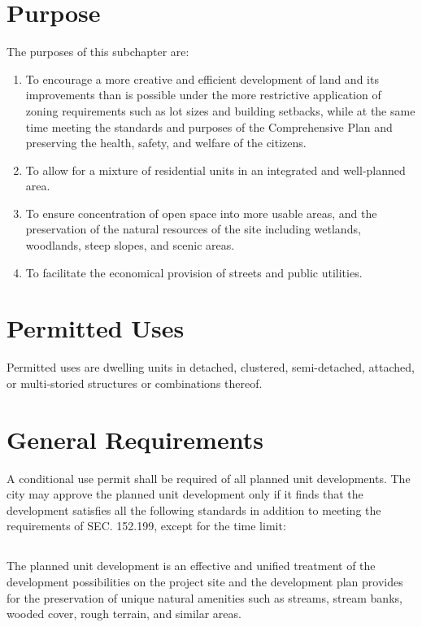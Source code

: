 \section{Purpose}
The purposes of this subchapter are:
\begin{enumerate}[{\indent}A)]
    \item To encourage a more creative and efficient development of land and its improvements than is possible under the more restrictive application of zoning requirements such as lot sizes and building setbacks, while at the same time meeting the standards and purposes of the Comprehensive Plan and preserving the health, safety, and welfare of the citizens.
    \item To allow for a mixture of residential units in an integrated and well-planned area.
    \item To ensure concentration of open space into more usable areas, and the preservation of the natural resources of the site including wetlands, woodlands, steep slopes, and scenic areas.
    \item To facilitate the economical provision of streets and public utilities.
\end{enumerate}

\section{Permitted Uses}
Permitted uses are dwelling units in detached, clustered, semi-detached, attached, or multi-storied structures or combinations thereof.

\section{General Requirements}
A conditional use permit shall be required of all planned unit developments. The city may approve the planned unit development only if it finds that the development satisfies all the following standards in addition to meeting the requirements of SEC. 152.199, except for the time limit:
\subsection{}
The planned unit development is an effective and unified treatment of the development possibilities on the project site and the development plan provides for the preservation of unique natural amenities such as streams, stream banks, wooded cover, rough terrain, and similar areas.
